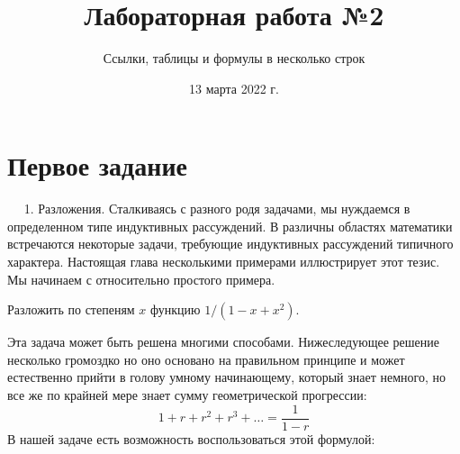 \documentclass[a4paper,12pt]{article} %
\author{Ссылки, таблицы и формулы в несколько строк}
\title{Лабораторная работа №2}
\date{13 марта 2022 г.}
\begin{document}
	
	\maketitle %
	
	\section{Первое задание}	
	
	$\quad$
	1. Разложения. Сталкиваясь с разного родя задачами, мы нуждаемся в определенном типе индуктивных рассуждений. В различны областях математики встречаются некоторые задачи, требующие индуктивных рассуждений типичного характера. Настоящая глава несколькими примерами иллюстрирует этот тезис. Мы начинаем с относительно простого примера.
	
	Разложить по степеням $x$ функцию $1 / \left(1 - x + x^2 \right).$
	
	Эта задача может быть решена многими способами. Нижеследующее решение несколько громоздко но оно основано на правильном принципе и может естественно прийти в голову умному начинающему, который знает немного, но все же по крайней мере знает сумму геометрической прогрессии:
	$$1 + r + r^2 + r^3 + \dots = \frac{1}{1 - r}$$
	В нашей задаче есть возможность воспользоваться этой формулой:
\end{document}
